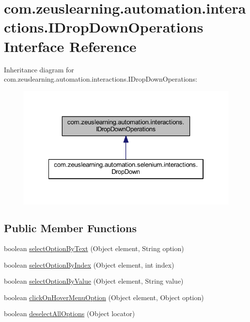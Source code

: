\hypertarget{interfacecom_1_1zeuslearning_1_1automation_1_1interactions_1_1IDropDownOperations}{}\section{com.\+zeuslearning.\+automation.\+interactions.\+I\+Drop\+Down\+Operations Interface Reference}
\label{interfacecom_1_1zeuslearning_1_1automation_1_1interactions_1_1IDropDownOperations}


Inheritance diagram for com.\+zeuslearning.\+automation.\+interactions.\+I\+Drop\+Down\+Operations\+:\nopagebreak
\begin{figure}[H]
\begin{center}
\leavevmode
\includegraphics[width=322pt]{dc/d60/interfacecom_1_1zeuslearning_1_1automation_1_1interactions_1_1IDropDownOperations__inherit__graph}
\end{center}
\end{figure}
\subsection*{Public Member Functions}
\begin{DoxyCompactItemize}
\item 
boolean \hyperlink{interfacecom_1_1zeuslearning_1_1automation_1_1interactions_1_1IDropDownOperations_acab57addaabfe48b82367a8a5a605d8e}{select\+Option\+By\+Text} (Object element, String option)
\item 
boolean \hyperlink{interfacecom_1_1zeuslearning_1_1automation_1_1interactions_1_1IDropDownOperations_ad895dc1fcaa582ece4c02e9102dd73c8}{select\+Option\+By\+Index} (Object element, int index)
\item 
boolean \hyperlink{interfacecom_1_1zeuslearning_1_1automation_1_1interactions_1_1IDropDownOperations_aa8d8cc39ebf833405a20ff1966d07b6b}{select\+Option\+By\+Value} (Object element, String value)
\item 
boolean \hyperlink{interfacecom_1_1zeuslearning_1_1automation_1_1interactions_1_1IDropDownOperations_add4d06e1de28d263d9451d67936c0324}{click\+On\+Hover\+Menu\+Option} (Object element, Object option)
\item 
boolean \hyperlink{interfacecom_1_1zeuslearning_1_1automation_1_1interactions_1_1IDropDownOperations_a4dd56924f06c48807581673c5c757405}{deselect\+All\+Options} (Object locator)
\end{DoxyCompactItemize}


